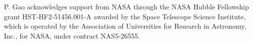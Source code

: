 \documentclass[twocolumn]{aastex63}
\begin{document}
\acknowledgments
\color{black}{We thank the anonymous reviewer for an interesting report that greatly helped improve the paper.} \color{black}P. Gao acknowledges support from NASA through the NASA Hubble Fellowship grant HST-HF2-51456.001-A awarded by the Space Telescope Science Institute, which is operated by the Association of Universities for Research in Astronomy, Inc., for NASA, under contract NAS5-26555.




\vspace{15mm}



\nocite{*}
{}

\end{document}
